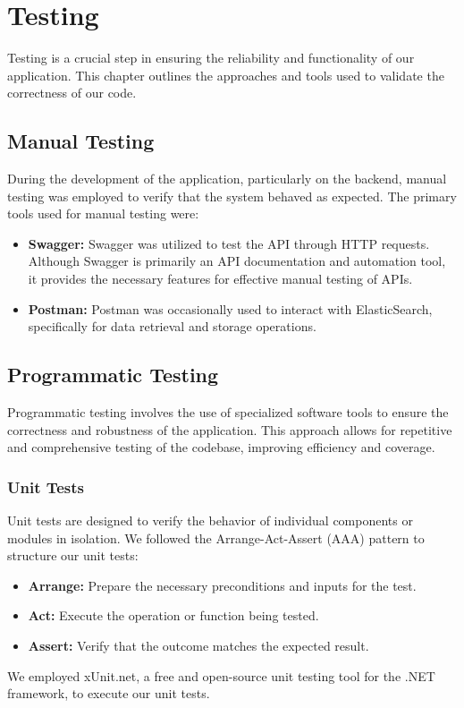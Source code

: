 \newpage

\section{Testing}

Testing is a crucial step in ensuring the reliability and functionality of our application. This chapter outlines the approaches and tools used to validate the correctness of our code.

\subsection{Manual Testing}

During the development of the application, particularly on the backend, manual testing was employed to verify that the system behaved as expected. The primary tools used for manual testing were:

\begin{itemize} 
	\item \textbf{Swagger:} Swagger\cite{Swagger} was utilized to test the API through HTTP requests. Although Swagger is primarily an API documentation and automation tool, it provides the necessary features for effective manual testing of APIs. 
	\item \textbf{Postman:} Postman\cite{Postman} was occasionally used to interact with ElasticSearch, specifically for data retrieval and storage operations. 
\end{itemize}

\subsection{Programmatic Testing}
Programmatic testing involves the use of specialized software tools to ensure the correctness and robustness of the application. This approach allows for repetitive and comprehensive testing of the codebase, improving efficiency and coverage.

\subsubsection{Unit Tests}
Unit tests are designed to verify the behavior of individual components or modules in isolation. We followed the Arrange-Act-Assert (AAA) pattern to structure our unit tests:

\begin{itemize} 
	\item \textbf{Arrange:} Prepare the necessary preconditions and inputs for the test. 
	\item \textbf{Act:} Execute the operation or function being tested. 
	\item \textbf{Assert:} Verify that the outcome matches the expected result. 
\end{itemize}

We employed xUnit.net, a free and open-source unit testing tool for the .NET framework, to execute our unit tests.